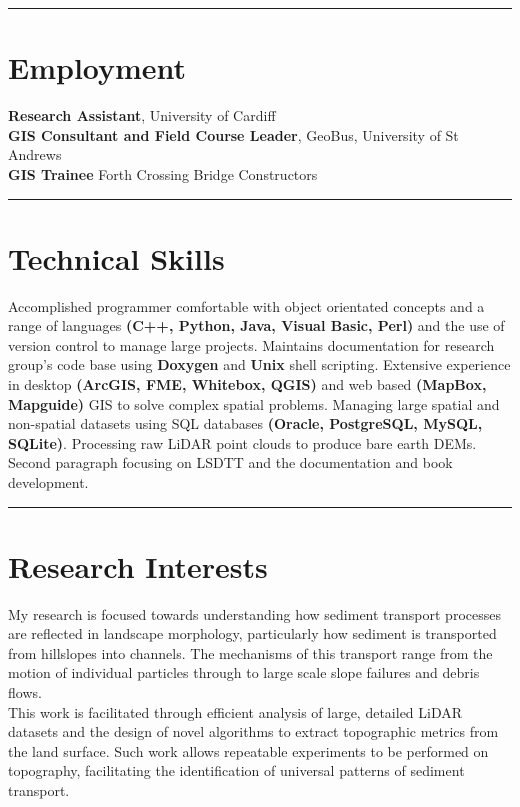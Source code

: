 \documentclass[10pt, a4paper]{article}
\newcommand{\years}[1]{\marginnote{\scriptsize #1}}
\begin{document}
\hrule
\section*{Employment}
\noindent

\years{2016} \textbf{Research Assistant}, University of Cardiff\\[0.05cm]
\years{2015} \textbf{GIS Consultant and Field Course Leader}, GeoBus, University of St Andrews\\[0.05cm]
\years{2012--2013} \textbf{GIS Trainee} Forth Crossing Bridge Constructors\\[0.05cm]

\hrule
\section*{Technical Skills}
\noindent

Accomplished programmer comfortable with object orientated concepts and a range of languages \textbf{(C++, Python, Java, Visual Basic, Perl)} and the use of version control to manage large projects. Maintains documentation for research group’s code base using \textbf{Doxygen} and \textbf{Unix} shell scripting. Extensive experience in desktop \textbf{(ArcGIS, FME, Whitebox, QGIS)} and web based \textbf{(MapBox, Mapguide)} GIS to solve complex spatial problems. Managing large spatial and non-spatial datasets using SQL databases \textbf{(Oracle, PostgreSQL, MySQL, SQLite)}. Processing raw LiDAR point clouds to produce bare earth DEMs.\\[0.05cm]

Second paragraph focusing on LSDTT and the documentation and book development. \\[0.05cm]

\hrule
\section*{Research Interests}
\noindent

My research is focused towards understanding how sediment transport processes are reflected in landscape morphology, particularly how sediment is transported from hillslopes into channels. The mechanisms of this transport range from the motion of individual particles through to large scale slope failures and debris flows.\\[0.05cm]

This work is facilitated through efficient analysis of large, detailed LiDAR datasets and the design of novel algorithms to extract topographic metrics from the land surface. Such work allows repeatable experiments to be performed on topography, facilitating the identification of universal patterns of sediment transport.\\[0.05cm]
\end{document}

